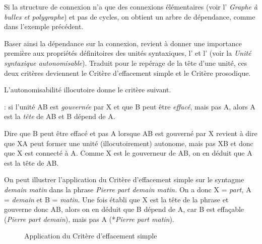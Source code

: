 Si la structure de connexion n’a que des connexions élémentaires (voir l’ \textit{Graphe à bulles et polygraphe}) et pas de cycles, on obtient un arbre de dépendance, comme dans l’exemple précédent.

Baser ainsi la dépendance sur la connexion, revient à donner une importance première aux propriétés définitoires des unités syntaxiques, l’ et l’ (voir la  \textit{Unité syntaxique autonomisable}). Traduit pour le repérage de la tête d’une unité, ces deux critères deviennent le Critère d’effacement simple et le Critère prosodique.

L’autonomisabilité illocutoire donne le critère suivant.

{ : si {l’unité} AB {est \textit{gouvernée} par} X et que B {peut être \textit{effacé}}, mais pas A, alors A {est la \textit{tête} de} AB et B dépend de A.}

Dire que B peut être effacé et pas A lorsque AB est gouverné par X revient à dire que XA peut former une unité (illocutoirement) autonome, mais pas XB et donc que X est connecté à A. Comme X est le gouverneur de AB, on en déduit que A est la tête de AB.

On peut illustrer l'application du Critère d'effacement simple sur le syntagme \textit{demain matin} dans la phrase \textit{Pierre part demain matin.}
On a donc X = \textit{part,} A = \textit{demain} et B = \textit{matin}. Une fois établi que X est la tête de la phrase et gouverne donc AB, alors on en déduit que B dépend de A, car B est effaçable (\textit{Pierre part demain}), mais pas A (*\textit{Pierre part matin}).

\begin{figure}
\caption{Application du Critère d’effacement simple}
\end{figure}

